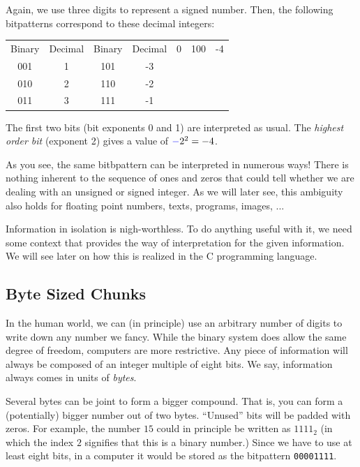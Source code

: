 \begin{defbox}
Again, we use three digits to represent a signed number. Then, the following bitpatterns correspond to these decimal integers:

\begin{center}
\begin{tabular}{cc|cc}
Binary & Decimal & Binary & Decimal  & 0 & 100 & -4 \\
001 & 1 & 101 & -3 \\
010 & 2 & 110 & -2 \\
011 & 3 & 111 & -1
\end{tabular}
\end{center}

The first two bits (bit exponents 0 and 1) are interpreted as usual. The \emph{highest order bit} (exponent 2) gives a value of ${\color{blue}-}2^2 = -4$.
\end{defbox}

\begin{warnbox}
As you see, the same bitbpattern can be interpreted in numerous ways! There is nothing inherent to the sequence of ones and zeros that could tell whether we are dealing with an unsigned or signed integer. As we will later see, this ambiguity also holds for floating point numbers, texts, programs, images, ...

Information in isolation is nigh-worthless. To do anything useful with it, we need some context that provides the way of interpretation for the given information. We will see later on how this is realized in the C programming language.
\end{warnbox}

\subsection{Byte Sized Chunks}
In the human world, we can (in principle) use an arbitrary number of digits to write down any number we fancy. While the binary system does allow the same degree of freedom, computers are more restrictive. Any piece of information will always be composed of an integer multiple of eight bits. We say, information always comes in units of \emph{bytes}.

Several bytes can be joint to form a bigger compound. That is, you can form a (potentially) bigger number out of two bytes. \enquote{Unused} bits will be padded with zeros. For example, the number $15$ could in principle be written as $1111_2$ (in which the index $2$ signifies that this is a binary number.) Since we have to use at least eight bits, in a computer it would be stored as the bitpattern \texttt{00001111}.

